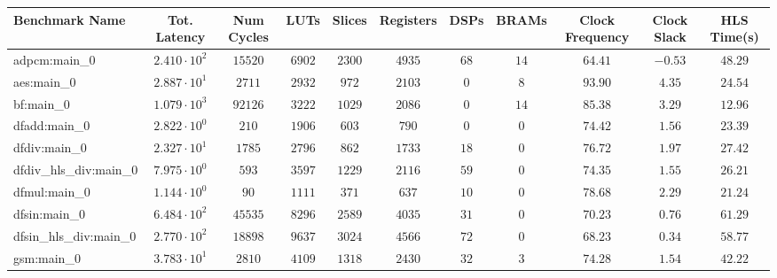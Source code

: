\begin{tabular}{|l|c|c|c|c|c|c|c|c|c|c|}
\hline
Benchmark Name          & Tot. Latency           & Num Cycles & LUTs      & Slices    & Registers & DSPs    & BRAMs   & Clock Frequency & Clock Slack & HLS Time(s) \\
\hline
adpcm:main\_0           & $ 2.410 \cdot 10^{2} $ & $ 15520  $ & $ 6902  $ & $ 2300  $ & $ 4935  $ & $ 68  $ & $ 14  $ & $ 64.41       $ & $ -0.53   $ & $ 48.29   $ \\
aes:main\_0             & $ 2.887 \cdot 10^{1} $ & $ 2711   $ & $ 2932  $ & $ 972   $ & $ 2103  $ & $ 0   $ & $ 8   $ & $ 93.90       $ & $ 4.35    $ & $ 24.54   $ \\
bf:main\_0              & $ 1.079 \cdot 10^{3} $ & $ 92126  $ & $ 3222  $ & $ 1029  $ & $ 2086  $ & $ 0   $ & $ 14  $ & $ 85.38       $ & $ 3.29    $ & $ 12.96   $ \\
dfadd:main\_0           & $ 2.822 \cdot 10^{0} $ & $ 210    $ & $ 1906  $ & $ 603   $ & $ 790   $ & $ 0   $ & $ 0   $ & $ 74.42       $ & $ 1.56    $ & $ 23.39   $ \\
dfdiv:main\_0           & $ 2.327 \cdot 10^{1} $ & $ 1785   $ & $ 2796  $ & $ 862   $ & $ 1733  $ & $ 18  $ & $ 0   $ & $ 76.72       $ & $ 1.97    $ & $ 27.42   $ \\
dfdiv\_hls\_div:main\_0 & $ 7.975 \cdot 10^{0} $ & $ 593    $ & $ 3597  $ & $ 1229  $ & $ 2116  $ & $ 59  $ & $ 0   $ & $ 74.35       $ & $ 1.55    $ & $ 26.21   $ \\
dfmul:main\_0           & $ 1.144 \cdot 10^{0} $ & $ 90     $ & $ 1111  $ & $ 371   $ & $ 637   $ & $ 10  $ & $ 0   $ & $ 78.68       $ & $ 2.29    $ & $ 21.24   $ \\
dfsin:main\_0           & $ 6.484 \cdot 10^{2} $ & $ 45535  $ & $ 8296  $ & $ 2589  $ & $ 4035  $ & $ 31  $ & $ 0   $ & $ 70.23       $ & $ 0.76    $ & $ 61.29   $ \\
dfsin\_hls\_div:main\_0 & $ 2.770 \cdot 10^{2} $ & $ 18898  $ & $ 9637  $ & $ 3024  $ & $ 4566  $ & $ 72  $ & $ 0   $ & $ 68.23       $ & $ 0.34    $ & $ 58.77   $ \\
gsm:main\_0             & $ 3.783 \cdot 10^{1} $ & $ 2810   $ & $ 4109  $ & $ 1318  $ & $ 2430  $ & $ 32  $ & $ 3   $ & $ 74.28       $ & $ 1.54    $ & $ 42.22   $ \\

\end{tabular}
